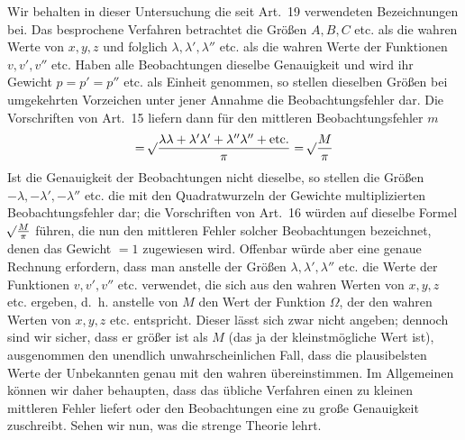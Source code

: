 Wir behalten in dieser Untersuchung die seit Art.\ 19 verwendeten Bezeichnungen bei. Das besprochene Verfahren betrachtet die Größen \(A,B,C\) etc. als die wahren Werte von \(x,y,z\) und folglich \(\lambda,\lambda',\lambda''\) etc. als die wahren Werte der Funktionen \(v,v',v''\) etc. Haben alle Beobachtungen dieselbe Genauigkeit und wird ihr Gewicht \(p=p'=p''\) etc. als Einheit genommen, so stellen dieselben Größen bei umgekehrten Vorzeichen unter jener Annahme die Beobachtungsfehler dar. Die Vorschriften von Art.\ 15 liefern dann für den mittleren Beobachtungsfehler \(m\)
\[
=\mathord{{}^{}\!\surd}\frac{\lambda\lambda+\lambda'\lambda'+\lambda''\lambda''+\text{etc.}}{\pi}=\mathord{{}^{}\!\surd}\frac{M}{\pi}
\]
Ist die Genauigkeit der Beobachtungen nicht dieselbe, so stellen die Größen \(-\lambda,-\lambda',-\lambda''\) etc. die mit den Quadratwurzeln der Gewichte multiplizierten Beobachtungsfehler dar; die Vorschriften von Art.\ 16 würden auf dieselbe Formel \(\mathord{{}^{}\!\surd}\frac{M}{\pi}\) führen, die nun den mittleren Fehler solcher Beobachtungen bezeichnet, denen das Gewicht \(=1\) zugewiesen wird. Offenbar würde aber eine genaue Rechnung erfordern, dass man anstelle der Größen \(\lambda,\lambda',\lambda''\) etc. die Werte der Funktionen \(v,v',v''\) etc. verwendet, die sich aus den wahren Werten von \(x,y,z\) etc. ergeben, d.\ h. anstelle von \(M\) den Wert der Funktion \(\Omega\), der den wahren Werten von \(x,y,z\) etc. entspricht. Dieser lässt sich zwar nicht angeben; dennoch sind wir sicher, dass er größer ist als \(M\) (das ja der kleinstmögliche Wert ist), ausgenommen den unendlich unwahrscheinlichen Fall, dass die plausibelsten Werte der Unbekannten genau mit den wahren übereinstimmen. Im Allgemeinen können wir daher behaupten, dass das übliche Verfahren einen zu kleinen mittleren Fehler liefert oder den Beobachtungen eine zu große Genauigkeit zuschreibt. Sehen wir nun, was die strenge Theorie lehrt.

